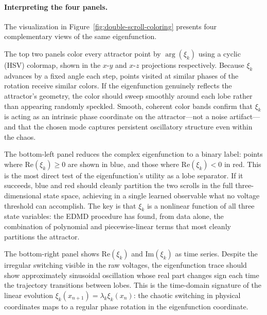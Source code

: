 \documentclass[11pt]{article}
\begin{document}
\paragraph{Interpreting the four panels.}
The visualization in Figure~\ref{fig:double-scroll-coloring} presents four complementary views of the same eigenfunction.

The top two panels color every attractor point by $\arg(\xi_k)$ using a cyclic (HSV) colormap, shown in the $x$-$y$ and $x$-$z$ projections respectively. Because $\xi_k$ advances by a fixed angle each step, points visited at similar phases of the rotation receive similar colors. If the eigenfunction genuinely reflects the attractor's geometry, the color should sweep smoothly around each lobe rather than appearing randomly speckled. Smooth, coherent color bands confirm that $\xi_k$ is acting as an intrinsic phase coordinate on the attractor---not a noise artifact---and that the chosen mode captures persistent oscillatory structure even within the chaos.

The bottom-left panel reduces the complex eigenfunction to a binary label: points where $\mathrm{Re}(\xi_k) \geq 0$ are shown in blue, and those where $\mathrm{Re}(\xi_k) < 0$ in red. This is the most direct test of the eigenfunction's utility as a lobe separator. If it succeeds, blue and red should cleanly partition the two scrolls in the full three-dimensional state space, achieving in a single learned observable what no voltage threshold can accomplish. The key is that $\xi_k$ is a nonlinear function of all three state variables: the EDMD procedure has found, from data alone, the combination of polynomial and piecewise-linear terms that most cleanly partitions the attractor.

The bottom-right panel shows $\mathrm{Re}(\xi_k)$ and $\mathrm{Im}(\xi_k)$ as time series. Despite the irregular switching visible in the raw voltages, the eigenfunction trace should show approximately sinusoidal oscillation whose real part changes sign each time the trajectory transitions between lobes. This is the time-domain signature of the linear evolution $\xi_k(x_{n+1}) = \lambda_k \xi_k(x_n)$: the chaotic switching in physical coordinates maps to a regular phase rotation in the eigenfunction coordinate.
\end{document}

